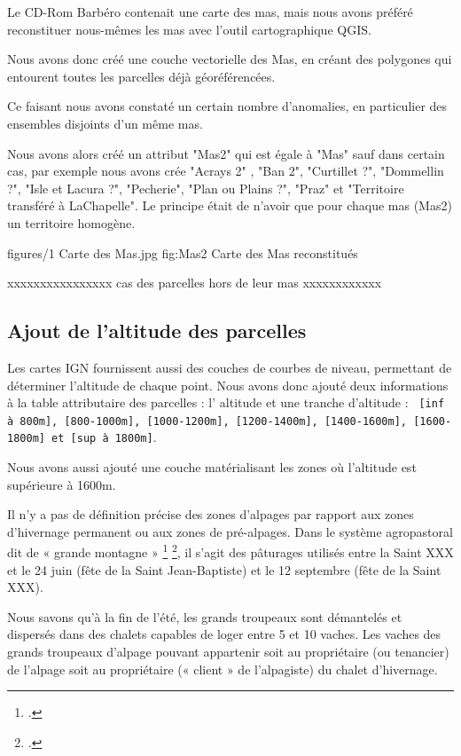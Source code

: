 Le CD-Rom Barbéro contenait une carte des mas, mais nous avons préféré reconstituer nous-mêmes les mas avec l'outil cartographique QGIS.

Nous avons donc créé une couche vectorielle des Mas, en créant des polygones qui entourent toutes les parcelles déjà géoréférencées.

Ce faisant nous avons constaté un certain nombre d'anomalies, en particulier des ensembles disjoints d'un même mas.

Nous avons alors créé un attribut "Mas2" qui est égale à "Mas" sauf dans certain cas, par exemple nous avons crée "Acrays 2" , "Ban 2", "Curtillet ?", "Dommellin ?", "Isle et Lacura ?", "Pecherie", "Plan ou Plains ?", "Praz" et "Territoire transféré à LaChapelle". Le principe était de n'avoir que pour chaque mas (Mas2) un territoire homogène.

\cartefigure
{figures/1 Carte des Mas.jpg}
{fig:Mas2}
{Carte des Mas reconstitués}

xxxxxxxxxxxxxxxx cas des parcelles hors de leur mas xxxxxxxxxxxx



\subsection{Ajout de l'altitude des parcelles}

Les cartes IGN fournissent aussi des couches de courbes de niveau, permettant de déterminer l'altitude de chaque point. Nous avons donc ajouté deux informations à la table attributaire des parcelles : l' altitude et une tranche d'altitude : \texttt{ [inf à 800m], [800-1000m], [1000-1200m], [1200-1400m], [1400-1600m], [1600-1800m] et [sup à 1800m]}.

Nous avons aussi ajouté une couche matérialisant les zones où l'altitude est supérieure à 1600m.

Il n’y a pas de définition précise des zones d’alpages par rapport aux zones d’hivernage permanent ou aux zones de pré-alpages. Dans le système agropastoral dit de « grande montagne » \footcite{ArbosMouthon2017} \footcite{Arbos1922}, il s’agit des pâturages utilisés entre la Saint XXX et le 24  juin (fête de la Saint Jean-Baptiste) et le 12 septembre (fête de la Saint XXX). 

Nous savons qu’à la fin de l’été, les grands troupeaux sont démantelés et dispersés dans des chalets capables de loger entre 5 et 10 vaches. Les vaches des grands troupeaux d’alpage pouvant appartenir soit au propriétaire (ou tenancier) de l’alpage soit au propriétaire (« client » de l’alpagiste) du chalet d’hivernage.

